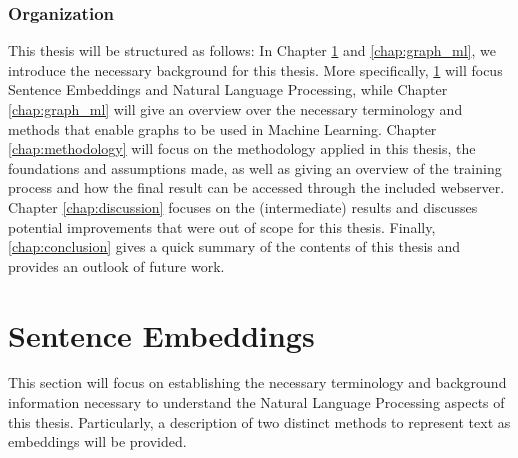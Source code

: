 \documentclass[draft,final]{vutinfth} %
\begin{document}
\subsection{Organization}
This thesis will be structured as follows: In Chapter \ref{chap:sentence_embeddings} and \ref{chap:graph_ml}, we introduce the necessary background for this thesis. More specifically, \ref{chap:sentence_embeddings} will focus Sentence Embeddings and Natural Language Processing, while Chapter \ref{chap:graph_ml} will give an overview over the necessary terminology and methods that enable graphs to be used in Machine Learning.
Chapter \ref{chap:methodology} will focus on the methodology applied in this thesis, the foundations and assumptions made, as well as giving an overview of the training process and how the final result can be accessed through the included webserver.
Chapter \ref{chap:discussion} focuses on the (intermediate) results and discusses potential improvements that were out of scope for this thesis. Finally, \ref{chap:conclusion} gives a quick summary of the contents of this thesis and provides an outlook of future work.


\chapter{Sentence Embeddings}\label{chap:sentence_embeddings}
This section will focus on establishing the necessary terminology and background information necessary to understand the Natural Language Processing aspects of this thesis. Particularly, a description of two distinct methods to represent text as embeddings will be provided.
\end{document}

